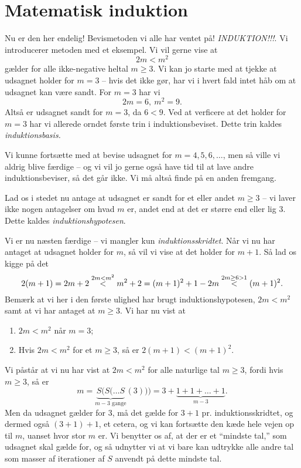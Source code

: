 \documentclass[a4paper, 12pt]{article}
\numberwithin{equation}{section}
\theoremstyle{plain}
\theoremstyle{definition}
\begin{document}
\section{Matematisk induktion}
Nu er den her endelig! Bevismetoden vi alle har ventet på! \emph{INDUKTION!!!}. Vi introducerer metoden med et eksempel. Vi vil gerne vise at 
\[
  2m<m^2
\]
gælder for alle ikke-negative heltal \(m\ge 3\). Vi kan jo starte med at tjekke at udsagnet holder for \(m=3\) -- hvis det ikke gør, har vi i hvert fald intet håb om at udsagnet kan være sandt. For \(m=3\) har vi
\[
  2m=6,\ m^2=9.
  \]
  Altså er udsagnet sandt for \(m=3\), da \(6<9\). Ved at verficere at det holder for \(m=3\) har vi allerede orndet første trin i induktionsbeviset. Dette trin kaldes \emph{induktionsbasis.}

  Vi kunne fortsætte med at bevise udsagnet for \(m=4,5,6,\ldots\), men så ville vi aldrig blive færdige -- og vi vil jo gerne også have tid til at lave andre induktionsbeviser, så det går ikke. Vi må altså finde på en anden fremgang.

  Lad os i stedet nu antage at udsagnet er sandt for et eller andet \(m\ge 3\) -- vi laver ikke nogen antagelser om hvad \(m\) er, andet end at det er større end eller lig 3. Dette kaldes \emph{induktionshypotesen}.

  Vi er nu næsten færdige -- vi mangler kun \emph{induktionsskridtet}. Når vi nu har antaget at udsagnet holder for \(m\), så vil vi vise at det holder for \(m+1\). Så lad os kigge på det
  \[
    2(m+1)=2m+2\buildrel{2m<m^2}\over{<}m^2+2=(m+1)^2+1-2m\buildrel{2m\ge 6>1}\over <(m+1)^2.
    \]
    Bemærk at vi her i den første ulighed har brugt induktionshypotesen, \(2m<m^2\) samt at vi har antaget at \(m\ge 3\). Vi har nu vist at
    \begin{enumerate}
    \item \(2m<m^2\) når \(m=3\);
      \item Hvis \(2m<m^2\) for et \(m\ge 3\), så er \(2(m+1)<(m+1)^2\).
    \end{enumerate}
    Vi påstår at vi nu har vist at \(2m<m^2\) for alle naturlige tal \(m\ge 3\), fordi hvis \(m\ge 3\), så er
    \[
      m=\underbrace{S(S(\ldots S}_{m-3\text{ gange}}(3)))=3+\underbrace{1+1+\ldots+1}_{m-3}.
      \]
      Men da udsagnet gælder for 3, må det gælde for \(3+1\) pr. induktionsskridtet, og dermed også \((3+1)+1\), et cetera, og vi kan fortsætte den kæde hele vejen op til \(m\), uanset hvor stor \(m\) er. Vi benytter os af, at der er et ``mindste tal,'' som udsagnet skal gælde for, og så udnytter vi at vi bare kan udtrykke alle andre tal som masser af iterationer af \(S\) anvendt på dette mindste tal.
\end{document}
